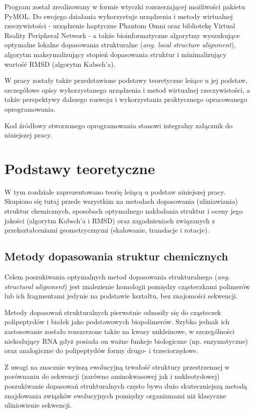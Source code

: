 \documentclass[licencjacka]{pracamgr}
\begin{document}
Program został zrealizowany w formie wtyczki rozszerzającej możliwości pakietu PyMOL. Do swojego działania wykorzystuje urządzenia i metody wirtualnej rzeczywistości - urządzenie haptyczne Phantom Omni oraz bibliotekę Virtual Reality Peripheral Network - a także bioinformatyczne algorytmy wyszukujące optymalne lokalne dopasowania strukturalne (\textit{ang. local structure alignment}), algorytm maksymalizujący stopień dopasowania struktur i minimalizujący wartość RMSD (algorytm Kabsch'a).

W pracy zostały także przedstawione podstawy teoretyczne leżące u jej podstaw, szczegółowe opisy wykorzystanego urządzenia i metod wirtualnej rzeczywistości, a także perspektywy dalszego rozwoju i wykorzystania praktycznego opracowanego oprogramowania.

Kod źródłowy stworzonego oprogramowania stanowi integralny załącznik do niniejszej pracy.

\chapter{Podstawy teoretyczne}
W tym rozdziale zaprezentowano teorię leżącą u podstaw niniejszej pracy. Skupiono się tutaj przede wszystkim na metodach dopasowania (uliniawiania) struktur chemicznych, sposobach optymalnego nakładania struktur i oceny jego jakości (algorytm Kabsch'a i RMSD) oraz zagadnieniach związanych z przekształceniami geometrycznymi (skalowanie, translacje i rotacje).

\section{Metody dopasowania struktur chemicznych}
Celem poszukiwania optymalnych metod dopasowania strukturalnego (\textit{ang. structural alignment}) jest znalezienie homologii pomiędzy cząsteczkami polimerów lub ich fragmentami jedynie na podstawie kształtu, bez znajomości sekwencji. 

Metody dopasowań strukturalnych pierwotnie odnosiły się do cząsteczek polipeptydów i białek jako podstawowych biopolimerów. Szybko jednak ich zastosowanie zostało rozszerzone także na kwasy nukleinowe, w szczególności niekodujący RNA gdyż posiada on ważne funkcje biologiczne (np. enzymatyczne) oraz analogiczne do polipeptydów formy drugo- i trzeciorzędowe. 

Z uwagi na znacznie wyższą ewolucyjną trwałość struktury przestrzennej w porównaniu do sekwencji (zarówno aminokwasowej jak i nukleotydowej) poszukiwanie dopasowań strukturalnych często bywa dużo skuteczniejszą metodą znajdowania związków ewolucyjnych pomiędzy organizmami niż klasyczne uliniowienie sekwencji. 
\end{document}
